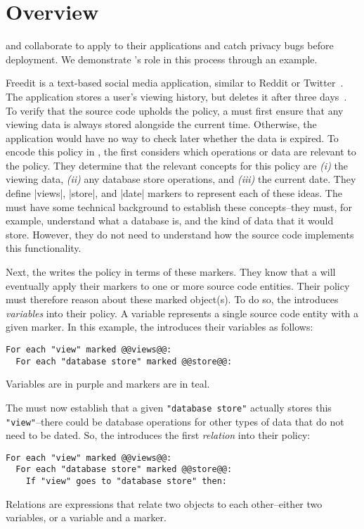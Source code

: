 \section{Overview}
\label{sec:overview}

\Ces{} and \devs{} collaborate to apply \sys{} to their applications and catch privacy bugs before deployment.
%
We demonstrate \syslang's role in this process through an example.

Freedit is a text-based social media application, similar to Reddit or Twitter~\cite{freedit}.
%
The application stores a user's viewing history, but deletes it after three days~\cite{freedit-pageviews}.
%
To verify that the source code upholds the policy, a \ce{} must first ensure that any viewing data is always stored alongside the current time.
%
Otherwise, the application would have no way to check later whether the data is expired.
%
To encode this policy in \syslang{}, the \ce{} first considers which operations or data are relevant to the policy.
%
They determine that the relevant concepts for this policy are \emph{(i)} the viewing data,
\emph{(ii)} any database store operations, and \emph{(iii)} the current date.
%
They define |views|, |store|, and |date| markers to represent each of these ideas.
%
The \ce{} must have some technical background to establish these concepts--they must, for example, understand what a database is,
and the kind of data that it would store.
%
However, they do not need to understand how the source code implements this functionality.
%

Next, the \ce{} writes the policy in terms of these markers.
%
They know that a \dev{} will eventually apply their markers to one or more source code entities.
%
Their policy must therefore reason about these marked object(s).
%
To do so, the \ce{} introduces \emph{variables} into their policy.
%
A variable represents a single source code entity with a given marker.
%
In this example, the \ce{} introduces their variables as follows:
\begin{lstlisting}[language=CNL]
For each "view" marked @@views@@:
  For each "database store" marked @@store@@:
\end{lstlisting}
%
Variables are in purple and markers are in teal.

The \ce{} must now establish that a given \lstinline[language=CNL]|"database store"| actually stores this \lstinline[language=CNL]|"view"|--there could be database operations for other types of data that do not need to be dated.
%
So, the \ce{} introduces the first \emph{relation} into their policy:
\begin{lstlisting}[language=CNL]
For each "view" marked @@views@@:
  For each "database store" marked @@store@@:
    If "view" goes to "database store" then:
\end{lstlisting}
%
Relations are expressions that relate two objects to each other--either two variables, or a variable and a marker.

